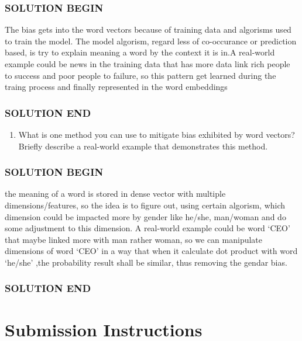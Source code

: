 \documentclass[11pt]{article}
\providecommand{\tightlist}{%
      \setlength{\itemsep}{0pt}\setlength{\parskip}{0pt}}
\begin{document}
    \subsubsection{SOLUTION BEGIN}\label{solution-begin}

The bias gets into the word vectors because of training data and
algorisms used to train the model. The model algorism, regard less of
co-occurance or prediction based, is try to explain meaning a word by
the context it is in.A real-world example could be news in the training
data that has more data link rich people to success and poor people to
failure, so this pattern get learned during the traing process and
finally represented in the word embeddings

\subsubsection{SOLUTION END}\label{solution-end}

    \begin{enumerate}
\def\labelenumi{\alph{enumi}.}
\setcounter{enumi}{1}
\tightlist
\item
  What is one method you can use to mitigate bias exhibited by word
  vectors? Briefly describe a real-world example that demonstrates this
  method.
\end{enumerate}

    \subsubsection{SOLUTION BEGIN}\label{solution-begin}

the meaning of a word is stored in dense vector with multiple
dimensions/features, so the idea is to figure out, using certain
algorism, which dimension could be impacted more by gender like he/she,
man/woman and do some adjustment to this dimension. A real-world example
could be word `CEO' that maybe linked more with man rather woman, so we
can manipulate dimensions of word `CEO' in a way that when it calculate
dot product with word `he/she' ,the probability result shall be similar,
thus removing the gendar bias.

\subsubsection{SOLUTION END}\label{solution-end}

    \section{\texorpdfstring{ Submission
Instructions}{ Submission Instructions}}\label{submission-instructions}
\end{document}
